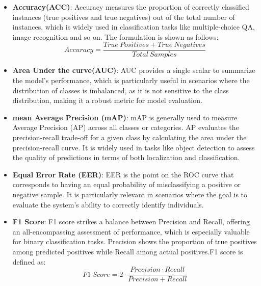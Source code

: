 \begin{itemize}
    \item \textbf{Accuracy(ACC)}\cite{bharadwaj2024vane,li2024mvbench,xu2023youku}: Accuracy measures the proportion of correctly classified instances (true positives and true negatives) out of the total number of instances, which is widely used in classification tasks like multiple-choice QA, image recognition and so on. The formulation is shown as follows:
        \[Accuracy = \frac{True \medspace Positives + True \medspace Negatives}{Total \medspace Samples}\]
    \item \textbf{Area Under the curve(AUC)}\cite{guo2024language,koutlis2024dimodif,zhang2024personamark}: AUC provides a single scalar to summarize the model's performance, which is particularly useful in scenarios where the distribution of classes is imbalanced, as it is not sensitive to the class distribution, making it a robust metric for model evaluation.
    \item \textbf{mean Average Precision (mAP)}\cite{cai2024av,koutlis2024dimodif}: mAP is generally used to measure Average Precision (AP) across all classes or categories. AP evaluates the precision-recall trade-off for a given class by calculating the area under the precision-recall curve. It is widely used in tasks like object detection to assess the quality of predictions in terms of both localization and classification.
    \item \textbf{Equal Error Rate (EER)}\cite{yan2024generalizing,li2024sonar,yu2024diffforensics}: EER is the point on the ROC curve that corresponds to having an equal probability of misclassifying a positive or negative sample. It is particularly relevant in scenarios where the goal is to evaluate the system's ability to correctly identify individuals.
    \item \textbf{F1 Score}\cite{li2024salad,fagni2021tweepfake,ji2024detecting,cheng2024beyond}: F1 score strikes a balance between Precision and Recall, offering an all-encompassing assessment of performance, which is especially valuable for binary classification tasks. Precision shows the proportion of true positives among predicted positives while Recall among actual positives.F1 score is defined as:
         \[F1 \medspace Score = 2 \cdot \frac{Precision \cdot Recall}{Precision + Recall}\]
\end{itemize}


